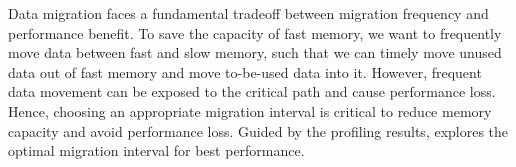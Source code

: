 
Data migration faces a fundamental tradeoff between migration frequency and performance benefit. To save the capacity of fast memory, we want to frequently move data between fast and slow memory, such that we can timely move unused data out of fast memory and move to-be-used data into it. However, frequent data movement can be exposed to the critical path and cause performance loss. Hence, choosing an appropriate migration interval is critical to reduce memory capacity and avoid performance loss. Guided by the profiling results, \name explores the optimal migration interval for best performance.


